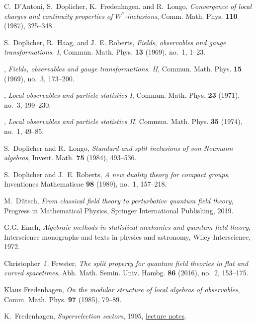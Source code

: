 \documentclass[12pt,a4paper]{article}
\newcommand{\1}{\mathds{1}}                         %
\begin{document}
{\begin{thebibliography}{BDFY15}
	C.~D'Antoni, S.~Doplicher, K.~Fredenhagen, and R.~Longo, \emph{Convergence of
		local charges and continuity properties of {$W^*$}-inclusions}, Comm. Math.
	Phys. \textbf{110} (1987), 325--348. 
	
	S.~Doplicher, R.~Haag, and J.~E. Roberts, \emph{Fields, observables and gauge
		transformations. {I}}, Commun. Math. Phys. \textbf{13} (1969), no.~1, 1--23.
	
	\bysame, \emph{Fields, observables and gauge transformations. {II}}, Commun.
	Math. Phys. \textbf{15} (1969), no.~3, 173--200.
	
	\bysame, \emph{Local observables and particle statistics {I}}, Commun. Math.
	Phys. \textbf{23} (1971), no.~3, 199--230.
	
	\bysame, \emph{Local observables and particle statistics {II}}, Commun. Math.
	Phys. \textbf{35} (1974), no.~1, 49--85.
	
	S.~Doplicher and R.~Longo, \emph{Standard and split inclusions of von {N}eumann
		algebras}, Invent. Math. \textbf{75} (1984), 493--536. 
	
	S.~Doplicher and J.~E. Roberts, \emph{A new duality theory for compact groups},
	Inventiones Mathematicae \textbf{98} (1989), no.~1, 157--218.
	
	M.~D{\"u}tsch, \emph{From classical field theory to perturbative quantum field
		theory}, Progress in Mathematical Physics, Springer International Publishing,
	2019.
	
	G.G. Emch, \emph{Algebraic methods in statistical mechanics and quantum field
		theory}, Interscience monographs and texts in physics and astronomy,
	Wiley-Interscience, 1972.
	
	Christopher~J. Fewster, \emph{The split property for quantum field theories in
		flat and curved spacetimes}, Abh. Math. Semin. Univ. Hambg. \textbf{86}
	(2016), no.~2, 153--175. 
	
	Klaus Fredenhagen, \emph{On the modular structure of local algebras of
		observables}, Comm. Math. Phys. \textbf{97} (1985), 79--89. 
	
	K.~Fredenhagen, \emph{Superselection sectors}, 1995,
	\href{https://unith.desy.de/sites/sites_custom/site_unith/content/e28509/e45341/e47501/e52578/Superselection.pdf}{lecture
		notes}.
	

\end{thebibliography}}
\end{document}
